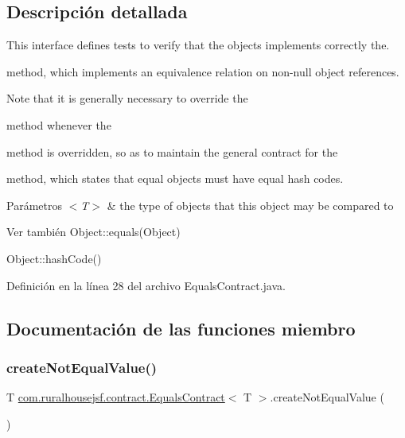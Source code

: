 \subsection{Descripción detallada}
This interface defines tests to verify that the objects implements correctly the. 


\begin{DoxyCode}{0}
\end{DoxyCode}
 method, which implements an equivalence relation on non-\/null object references. 

Note that it is generally necessary to override the
\begin{DoxyCode}{0}
\end{DoxyCode}
 method whenever the
\begin{DoxyCode}{0}
\end{DoxyCode}
 method is overridden, so as to maintain the general contract for the
\begin{DoxyCode}{0}
\end{DoxyCode}
 method, which states that equal objects must have equal hash codes.


\begin{DoxyParams}{Parámetros}
{\em $<$\+T$>$} & the type of objects that this object may be compared to\\
\hline
\end{DoxyParams}
\begin{DoxySeeAlso}{Ver también}
Object\+::equals(\+Object) 

Object\+::hash\+Code() 
\end{DoxySeeAlso}


Definición en la línea 28 del archivo Equals\+Contract.\+java.



\subsection{Documentación de las funciones miembro}
\mbox{\label{a00240_a65840509b57f6b89e42e2abf1978aa01}} 
\subsubsection{\texorpdfstring{createNotEqualValue()}{createNotEqualValue()}}
{\footnotesize\ttfamily T \mbox{\hyperlink{a00240}{com.\+ruralhousejsf.\+contract.\+Equals\+Contract}}$<$ T $>$.create\+Not\+Equal\+Value (\begin{DoxyParamCaption}{ }\end{DoxyParamCaption})}



